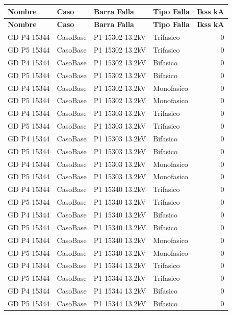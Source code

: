 \documentclass[11pt,a4paper]{article}
\begin{document}
\small
\begin{longtable}{llllr}
\toprule
\textbf{Nombre} & \textbf{Caso} & \textbf{Barra Falla} & \textbf{Tipo Falla} & \textbf{Ikss kA} \\
\midrule
\endfirsthead
\toprule
\textbf{Nombre} & \textbf{Caso} & \textbf{Barra Falla} & \textbf{Tipo Falla} & \textbf{Ikss kA} \\
\midrule
\endhead
\bottomrule
\endfoot
GD P4 15344 & CasoBase & P1 15302 13.2kV & Trifasico & 0 \\
GD P5 15344 & CasoBase & P1 15302 13.2kV & Trifasico & 0 \\
GD P4 15344 & CasoBase & P1 15302 13.2kV & Bifasico & 0 \\
GD P5 15344 & CasoBase & P1 15302 13.2kV & Bifasico & 0 \\
GD P4 15344 & CasoBase & P1 15302 13.2kV & Monofasico & 0 \\
GD P5 15344 & CasoBase & P1 15302 13.2kV & Monofasico & 0 \\
GD P4 15344 & CasoBase & P1 15303 13.2kV & Trifasico & 0 \\
GD P5 15344 & CasoBase & P1 15303 13.2kV & Trifasico & 0 \\
GD P4 15344 & CasoBase & P1 15303 13.2kV & Bifasico & 0 \\
GD P5 15344 & CasoBase & P1 15303 13.2kV & Bifasico & 0 \\
GD P4 15344 & CasoBase & P1 15303 13.2kV & Monofasico & 0 \\
GD P5 15344 & CasoBase & P1 15303 13.2kV & Monofasico & 0 \\
GD P4 15344 & CasoBase & P1 15340 13.2kV & Trifasico & 0 \\
GD P5 15344 & CasoBase & P1 15340 13.2kV & Trifasico & 0 \\
GD P4 15344 & CasoBase & P1 15340 13.2kV & Bifasico & 0 \\
GD P5 15344 & CasoBase & P1 15340 13.2kV & Bifasico & 0 \\
GD P4 15344 & CasoBase & P1 15340 13.2kV & Monofasico & 0 \\
GD P5 15344 & CasoBase & P1 15340 13.2kV & Monofasico & 0 \\
GD P4 15344 & CasoBase & P1 15344 13.2kV & Trifasico & 0 \\
GD P5 15344 & CasoBase & P1 15344 13.2kV & Trifasico & 0 \\
GD P4 15344 & CasoBase & P1 15344 13.2kV & Bifasico & 0 \\
GD P5 15344 & CasoBase & P1 15344 13.2kV & Bifasico & 0 \\

\end{longtable}
\end{document}
